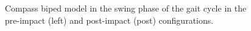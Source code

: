 \begin{figure}[!h]
	\centering
  	\caption{Compass biped model in the swing phase of the gait cycle in the pre-impact (left) and post-impact (post) configurations.}
	\label{fig:prepost}
\end{figure}

